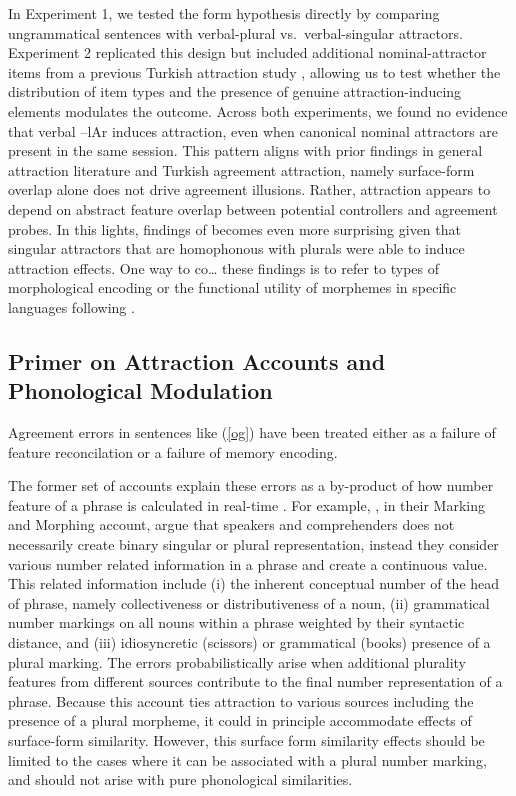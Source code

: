 \documentclass[
  authoryear,
  3p]{elsarticle}
\begin{document}
In Experiment 1, we tested the form hypothesis directly by comparing
ungrammatical sentences with verbal-plural vs.~verbal-singular
attractors. Experiment 2 replicated this design but included additional
nominal-attractor items from a previous Turkish attraction study
\citep{TurkLogacev2024}, allowing us to test whether the distribution of
item types and the presence of genuine attraction-inducing elements
modulates the outcome. Across both experiments, we found no evidence
that verbal --lAr induces attraction, even when canonical nominal
attractors are present in the same session. This pattern aligns with
prior findings in general attraction literature and Turkish agreement
attraction, namely surface-form overlap alone does not drive agreement
illusions. Rather, attraction appears to depend on abstract feature
overlap between potential controllers and agreement probes. In this
lights, findings of \citet{Slioussar2018} becomes even more surprising
given that singular attractors that are homophonous with plurals were
able to induce attraction effects. One way to co\ldots{} these findings
is to refer to types of morphological encoding or the functional utility
of morphemes in specific languages following \citet{KeshevDillon2024}.

\subsection{Primer on Attraction Accounts and Phonological
Modulation}\label{primer-on-attraction-accounts-and-phonological-modulation}

Agreement errors in sentences like (\ref{og}) have been treated either
as a failure of feature reconcilation or a failure of memory encoding.

The former set of accounts explain these errors as a by-product of how
number feature of a phrase is calculated in real-time
\citep{BockMiller:1991, EberhardEtAl2005, HammerlyEtAl2019}. For
example, \citet{EberhardEtAl2005}, in their Marking and Morphing
account, argue that speakers and comprehenders does not necessarily
create binary singular or plural representation, instead they consider
various number related information in a phrase and create a continuous
value. This related information include (i) the inherent conceptual
number of the head of phrase, namely collectiveness or distributiveness
of a noun, (ii) grammatical number markings on all nouns within a phrase
weighted by their syntactic distance, and (iii) idiosyncretic (scissors)
or grammatical (books) presence of a plural marking. The errors
probabilistically arise when additional plurality features from
different sources contribute to the final number representation of a
phrase. Because this account ties attraction to various sources
including the presence of a plural morpheme, it could in principle
accommodate effects of surface-form similarity. However, this surface
form similarity effects should be limited to the cases where it can be
associated with a plural number marking, and should not arise with pure
phonological similarities.
\end{document}
